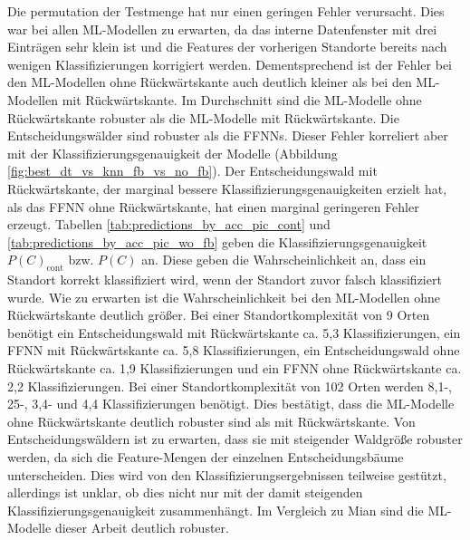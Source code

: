 \newline
Die permutation der Testmenge hat nur einen geringen Fehler verursacht.
Dies war bei allen ML-Modellen zu erwarten, da das interne Datenfenster mit drei Einträgen sehr klein ist
und die Features der vorherigen Standorte bereits nach wenigen Klassifizierungen korrigiert werden.
Dementsprechend ist der Fehler bei den ML-Modellen ohne Rückwärtskante auch deutlich kleiner als bei den ML-Modellen mit Rückwärtskante.
\newline
\newline
Im Durchschnitt sind die ML-Modelle ohne Rückwärtskante robuster als die ML-Modelle mit Rückwärtskante.
Die Entscheidungswälder sind robuster als die FFNNs.
Dieser Fehler korreliert aber mit der Klassifizierungsgenauigkeit der Modelle (Abbildung \ref{fig:best_dt_vs_knn_fb_vs_no_fb}).
Der Entscheidungswald mit Rückwärtskante, der marginal bessere Klassifizierungsgenauigkeiten erzielt hat, als das FFNN ohne Rückwärtskante,
hat einen marginal geringeren Fehler erzeugt.
\newline
\newline
Tabellen \ref{tab:predictions_by_acc_pic_cont} und \ref{tab:predictions_by_acc_pic_wo_fb} geben die Klassifizierungsgenauigkeit $P(C)_{\text{cont}}$ bzw. $P(C)$ an.
Diese geben die Wahrscheinlichkeit an, dass ein Standort korrekt klassifiziert wird, wenn der Standort zuvor falsch klassifiziert wurde.
Wie zu erwarten ist die Wahrscheinlichkeit bei den ML-Modellen ohne Rückwärtskante deutlich größer.
Bei einer Standortkomplexität von 9 Orten benötigt ein Entscheidungswald mit Rückwärtskante ca. 5,3 Klassifizierungen,
ein FFNN mit Rückwärtskante ca. 5,8 Klassifizierungen, ein Entscheidungswald ohne Rückwärtskante ca. 1,9 Klassifizierungen
und ein FFNN ohne Rückwärtskante ca. 2,2 Klassifizierungen.
Bei einer Standortkomplexität von 102 Orten werden 8,1-, 25-, 3,4- und 4,4 Klassifizierungen benötigt.
Dies bestätigt, dass die ML-Modelle ohne Rückwärtskante deutlich robuster sind als mit Rückwärtskante.
\newline
\newline
Von Entscheidungswäldern ist zu erwarten, dass sie mit steigender Waldgröße robuster werden, da sich die Feature-Mengen der einzelnen Entscheidungsbäume unterscheiden.
Dies wird von den Klassifizierungsergebnissen teilweise gestützt, allerdings ist unklar, ob dies nicht nur mit der damit steigenden Klassifizierungsgenauigkeit zusammenhängt.
\newline
\newline
Im Vergleich zu Mian sind die ML-Modelle dieser Arbeit deutlich robuster.
